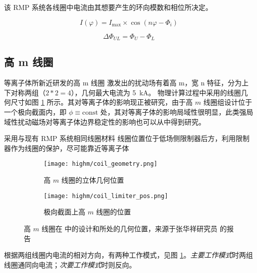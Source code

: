 该 RMP 系统各线圈中电流由其想要产生的环向模数和相位所决定。

\begin{equation}
I(\varphi)=I_{\max } \times \cos \left(n \varphi-\Phi_{i}\right)
\end{equation}

\begin{equation}
\Delta \Phi_{UL} = \Phi_U - \Phi_L
\end{equation}


\subsection{高 m 线圈}
等离子体所新近研发的高 m 线圈  激发出的扰动场有着高 m，宽 n 特征，分为上下对称两组（$2*2=4$），几何最大电流为 \SI{5}{\kilo\ampere}。 
物理计算过程中采用的线圈几何尺寸如图 \ref{fig:highm-pos} 所示。其对等离子体的影响现正被研究，由于高 $m$ 线圈组设计位于一个极向截面内，即 $\phi\equiv \text{const}$ 处，其对等离子体的影响局域性很明显，此类强局域性扰动磁场对等离子体边界稳定性的影响也可以从中得到研究。

采用与现有 RMP 系统相同线圈材料 线圈位置位于低场侧限制器后方，利用限制器作为线圈的保护，尽可能靠近等离子体 


\begin{figure}[htbp]
    \centering%
    \begin{subfigure}{0.45\textwidth}
      \texttt{[image: highm/coil\_geometry.png]}
      \caption{高 $m$ 线圈的立体几何位置}
    \end{subfigure}
    \begin{subfigure}{0.45\textwidth}
      \texttt{[image: highm/coil\_limiter\_pos.png]}
      \caption{极向截面上高 $m$ 线圈的位置}
    \end{subfigure}
    \caption{高 $m$ 线圈在 \east 中的设计和所处的几何位置，来源于张华祥研究员 \cite{zhang_highm} 的报告}
    \label{fig:highm-pos}
  \end{figure}

根据两组线圈内电流的相对方向，有两种工作模式，见图 \ref{fig:highm-pos}。\textit{主要工作模式}时两组线圈通同向电流；\textit{次要工作模式}时则反向。



